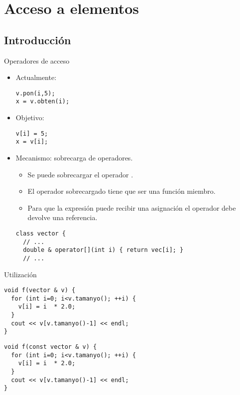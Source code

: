 \section{Acceso a elementos}

\subsection{Introducción}

\begin{frame}[fragile]{Operadores de acceso}
\begin{itemize}
  \item Actualmente:
\begin{lstlisting}
v.pon(i,5);
x = v.obten(i);
\end{lstlisting}
  \item \alert{Objetivo}:
\begin{lstlisting}
v[i] = 5;
x = v[i];
\end{lstlisting}
  \item Mecanismo: sobrecarga de operadores.
    \begin{itemize}
      \item Se puede sobrecargar el operador \cppid{[]}.
      \item El operador sobrecargado tiene que ser una función miembro.
      \item Para que la expresión  puede recibir una asignación 
            el operador debe devolve una referencia.
    \end{itemize}
\begin{lstlisting}
class vector {
  // ...
  double & operator[](int i) { return vec[i]; }
  // ...
\end{lstlisting}
\end{itemize}
\end{frame}

\begin{frame}[fragile]{Utilización}
\begin{lstlisting}
void f(vector & v) {
  for (int i=0; i<v.tamanyo(); ++i) {
    v[i] = i  * 2.0;
  }
  cout << v[v.tamanyo()-1] << endl;
}
\end{lstlisting}
\pause
\begin{lstlisting}
void f(const vector & v) {
  for (int i=0; i<v.tamanyo(); ++i) {
    v[i] = i  * 2.0;
  }
  cout << v[v.tamanyo()-1] << endl;
}
\end{lstlisting}
\end{frame}

